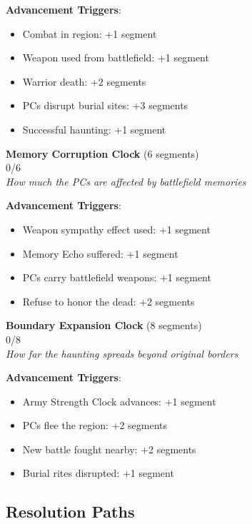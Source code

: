 \documentclass[11pt]{article}
\newcommand{\clocksegment}{\textbullet}
\begin{document}
\textbf{Advancement Triggers}:
\begin{itemize}[leftmargin=*]
\item Combat in region: +1 segment
\item Weapon used from battlefield: +1 segment
\item Warrior death: +2 segments
\item PCs disrupt burial sites: +3 segments
\item Successful haunting: +1 segment
\end{itemize}

\begin{center}
\textbf{Memory Corruption Clock} (6 segments)\\
\fbox{\clocksegment\clocksegment\clocksegment\clocksegment\clocksegment\clocksegment} 0/6\\
\textit{How much the PCs are affected by battlefield memories}
\end{center}

\textbf{Advancement Triggers}:
\begin{itemize}[leftmargin=*]
\item Weapon sympathy effect used: +1 segment
\item Memory Echo suffered: +1 segment
\item PCs carry battlefield weapons: +1 segment
\item Refuse to honor the dead: +2 segments
\end{itemize}

\begin{center}
\textbf{Boundary Expansion Clock} (8 segments)\\
\fbox{\clocksegment\clocksegment\clocksegment\clocksegment\clocksegment\clocksegment\clocksegment\clocksegment} 0/8\\
\textit{How far the haunting spreads beyond original borders}
\end{center}

\textbf{Advancement Triggers}:
\begin{itemize}[leftmargin=*]
\item Army Strength Clock advances: +1 segment
\item PCs flee the region: +2 segments
\item New battle fought nearby: +2 segments
\item Burial rites disrupted: +1 segment
\end{itemize}

\subsection*{Resolution Paths}
\end{document}
